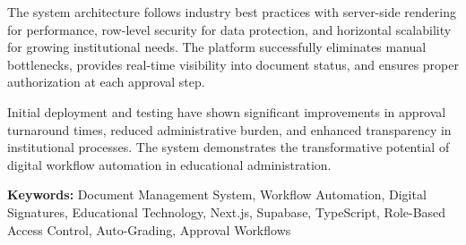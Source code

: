 The system architecture follows industry best practices with server-side rendering for performance, row-level security for data protection, and horizontal scalability for growing institutional needs. The platform successfully eliminates manual bottlenecks, provides real-time visibility into document status, and ensures proper authorization at each approval step.

Initial deployment and testing have shown significant improvements in approval turnaround times, reduced administrative burden, and enhanced transparency in institutional processes. The system demonstrates the transformative potential of digital workflow automation in educational administration.

\vspace{1cm}

\noindent
\textbf{Keywords:} Document Management System, Workflow Automation, Digital Signatures, Educational Technology, Next.js, Supabase, TypeScript, Role-Based Access Control, Auto-Grading, Approval Workflows

\newpage
